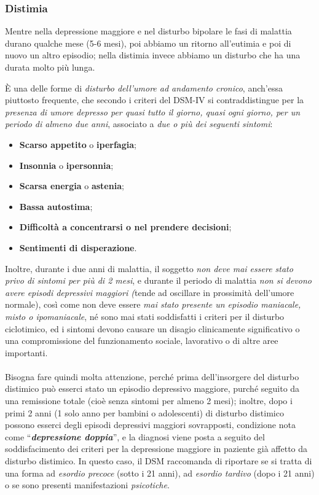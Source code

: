 \subsubsection{Distimia}

Mentre nella depressione maggiore e nel disturbo bipolare le fasi di
malattia durano qualche mese (5-6 mesi), poi abbiamo un ritorno
all'eutimia e poi di nuovo un altro episodio; nella distimia invece
abbiamo un disturbo che ha una durata molto più lunga.

È una delle forme di \emph{disturbo dell'umore ad andamento cronico},
anch'essa piuttosto frequente, che secondo i criteri del DSM-IV si
contraddistingue per la \emph{presenza di umore depresso per quasi tutto
il giorno, quasi ogni giorno, per un periodo di almeno due anni},
associato a \emph{due o più dei seguenti sintomi}:

\begin{itemize}
\item
  \textbf{Scarso appetito} o \textbf{iperfagia};
\item
  \textbf{Insonnia} o \textbf{ipersonnia};
\item
  \textbf{Scarsa energia} o \textbf{astenia};
\item
  \textbf{Bassa autostima};
\item
  \textbf{Difficoltà a concentrarsi o nel prendere decisioni};
\item
  \textbf{Sentimenti di disperazione}.
\end{itemize}

Inoltre, durante i due anni di malattia, il soggetto \emph{non deve mai
essere stato privo di sintomi per più di 2 mesi}, e durante il periodo
di malattia \emph{non si devono avere episodi depressivi maggiori
(}tende ad oscillare in prossimità dell'umore normale), così come non
deve essere \emph{mai stato presente un episodio maniacale, misto o
ipomaniacale}, né sono mai stati soddisfatti i criteri per il disturbo
ciclotimico, ed i sintomi devono causare un disagio clinicamente
significativo o una compromissione del funzionamento sociale, lavorativo
o di altre aree importanti.
\\\\
Bisogna fare quindi molta attenzione, perché prima dell'insorgere del
disturbo distimico può esserci stato un episodio depressivo maggiore,
purché seguito da una remissione totale (cioè senza sintomi per almeno 2
mesi); inoltre, dopo i primi 2 anni (1 solo anno per bambini o
adolescenti) di disturbo distimico possono esserci degli episodi
depressivi maggiori sovrapposti, condizione nota come
``\textbf{\emph{depressione doppia}}'', e la diagnosi viene posta a
seguito del soddisfacimento dei criteri per la depressione maggiore in
paziente già affetto da disturbo distimico. In questo caso, il DSM
raccomanda di riportare se si tratta di una forma ad \emph{esordio
precoce} (sotto i 21 anni), ad \emph{esordio tardivo} (dopo i 21 anni) o
se sono presenti manifestazioni \emph{psicotiche}.

